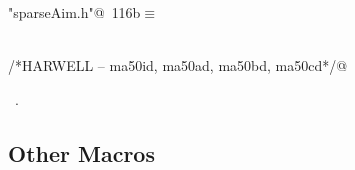 \documentclass{article}
\begin{document}
\begin{description}
\begin{flushleft}
\begin{minipage}{\linewidth}
\begin{list}{}{\setlength{\itemsep}{-\parsep}\setlength{\itemindent}{-\leftmargin}}
\item{}
\end{list}
\end{minipage}\vspace{4ex}
\end{flushleft}
\item[ solve general sparse linear system]
\begin{flushleft} \small
\begin{minipage}{\linewidth}\label{scrap215}\raggedright\small
{} \verb@"sparseAim.h"@\nobreak\ {\footnotesize {116b}}$\equiv$
\vspace{-1ex}
\begin{list}{}{} \item
\mbox{}\verb@@\\
\mbox{}\verb@/*HARWELL -- ma50id, ma50ad, ma50bd, ma50cd*/@\\
\mbox{}\verb@@{\NWsep}
\end{list}
\vspace{-1.5ex}
\footnotesize
\begin{list}{}{\setlength{\itemsep}{-\parsep}\setlength{\itemindent}{-\leftmargin}}
\item \NWtxtFileDefBy\ .

\item{}
\end{list}
\end{minipage}\vspace{4ex}
\end{flushleft}
\end{description}

\subsection{Other Macros}
\label{sec:othermacros}
\end{document}
